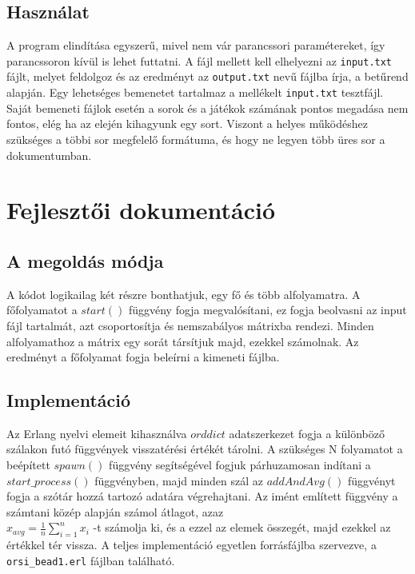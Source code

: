 \documentclass{article}
\begin{document}
	\subsection{Használat}
	A program elindítása egyszerű, mivel nem vár parancssori paramétereket, így
	parancssoron kívül is lehet futtatni. A fájl mellett kell elhelyezni az \texttt{input.txt}
	fájlt, melyet feldolgoz és az eredményt az \texttt{output.txt} nevű fájlba írja, a betűrend  alapján.
	Egy lehetséges bemenetet tartalmaz a mellékelt \texttt{input.txt} tesztfájl. Saját
	bemeneti fájlok esetén a sorok és a játékok számának pontos megadása nem fontos, elég ha az elején kihagyunk egy sort. Viszont  a helyes működéshez szükséges a többi sor megfelelő formátuma, és hogy ne legyen több üres sor a dokumentumban.
	
	\section{Fejlesztői dokumentáció}
	
	\subsection{A megoldás módja}
	A kódot logikailag két részre bonthatjuk, egy fő és több alfolyamatra. A főfolyamatot
	a \(start()\) függvény fogja megvalósítani, ez fogja beolvasni az input fájl tartalmát,
	azt csoportosítja és nemszabályos mátrixba rendezi. Minden alfolyamathoz a mátrix egy sorát
	társítjuk majd, ezekkel számolnak. Az eredményt a főfolyamat fogja beleírni
	a kimeneti fájlba.
	
	\subsection{Implementáció}
	Az Erlang nyelvi elemeit kihasználva \(orddict\) adatszerkezet fogja a különböző szálakon futó függvények visszatérési értékét tárolni. A szükséges N folyamatot a beépített \(spawn()\) függvény segítségével fogjuk párhuzamosan indítani a \(start\_process()\) függvényben, majd minden szál az \(addAndAvg()\) függvényt fogja a szótár hozzá
	tartozó adatára végrehajtani. Az imént említett függvény a számtani közép alapján számol átlagot, azaz
	\\ \( x_{avg} = \frac{1}{n} \sum_{i=1}^{n} x_{i} \) -t számolja ki, és a ezzel az elemek összegét, majd ezekkel az értékkel tér vissza. A teljes implementáció egyetlen forrásfájlba szervezve, a \texttt{orsi\_bead1.erl} fájlban található.
	
\end{document}
